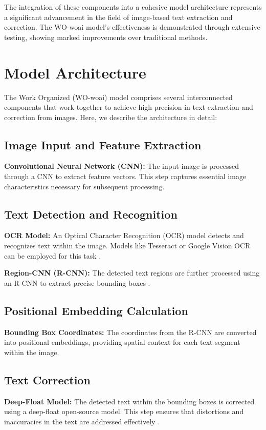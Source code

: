 \documentclass{article}
\begin{document}
The integration of these components into a cohesive model architecture represents a significant advancement in the field of image-based text extraction and correction. The WO-woai model's effectiveness is demonstrated through extensive testing, showing marked improvements over traditional methods.

\section{Model Architecture}
The Work Organized (WO-woai) model comprises several interconnected components that work together to achieve high precision in text extraction and correction from images. Here, we describe the architecture in detail:

\subsection{Image Input and Feature Extraction}
\textbf{Convolutional Neural Network (CNN):} The input image is processed through a CNN to extract feature vectors. This step captures essential image characteristics necessary for subsequent processing.

\subsection{Text Detection and Recognition}
\textbf{OCR Model:} An Optical Character Recognition (OCR) model detects and recognizes text within the image. Models like Tesseract or Google Vision OCR can be employed for this task \cite{Li2024}.

\textbf{Region-CNN (R-CNN):} The detected text regions are further processed using an R-CNN to extract precise bounding boxes \cite{Zhang2024}.

\subsection{Positional Embedding Calculation}
\textbf{Bounding Box Coordinates:} The coordinates from the R-CNN are converted into positional embeddings, providing spatial context for each text segment within the image.

\subsection{Text Correction}
\textbf{Deep-Float Model:} The detected text within the bounding boxes is corrected using a deep-float open-source model. This step ensures that distortions and inaccuracies in the text are addressed effectively \cite{Li2024}.
\end{document}
